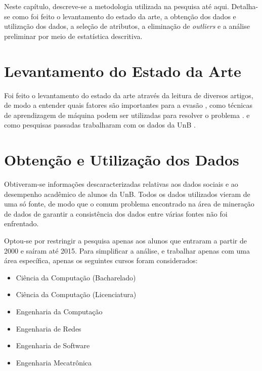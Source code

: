 Neste capítulo, descreve-se a metodologia utilizada na pesquisa até aqui. 
Detalha-se como foi feito o levantamento
do estado da arte, a obtenção dos dados e utilização dos dados, a seleção de
atributos, a eliminação de \textit{outliers} e a análise preliminar por meio de estatística
descritiva. 

\section{Levantamento do Estado da Arte}
Foi feito o levantamento do estado da arte através da leitura de diversos artigos, de
modo a entender quais fatores são importantes para a evasão \cite{adeodato}
\cite{hoed_fatores} \cite{dropout_finland}, como técnicas de
aprendizagem de máquina podem ser utilizadas para resolver o problema \cite{adeodato}
 \cite{data_mining_retention}.
e como pesquisas passadas trabalharam com os dados da UnB
\cite{manual_calouro} \cite{hoed_sobrevivencia}. 

\section{Obtenção e Utilização dos Dados}
Obtiveram-se informações descaracterizadas relativas aos dados sociais e ao
desempenho acadêmico de alunos da UnB. Todos os dados utilizados vieram de uma só
fonte, de modo que o comum problema encontrado na área de mineração de dados de
garantir a consistência dos dados entre várias fontes não foi enfrentado. 
\par Optou-se por restringir a pesquisa apenas aos alunos que entraram a partir de
2000 e saíram até 2015. Para simplificar a análise, e trabalhar apenas com uma área
específica, apenas os seguintes cursos foram considerados: 
\begin{itemize}
    \item Ciência da Computação (Bacharelado)
    \item Ciência da Computação (Licenciatura)
    \item Engenharia da Computação 
    \item Engenharia de Redes
    \item Engenharia de Software
    \item Engenharia Mecatrônica
\end{itemize}

